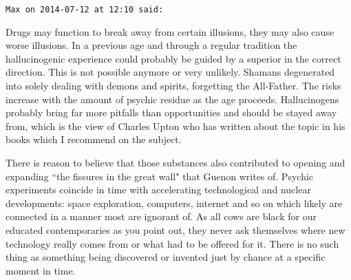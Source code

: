 \begin{footnotesize}
\begin{sffamily}
\hfill

\texttt{Max on 2014-07-12 at 12:10 said: }

Drugs may function to break away from certain illusions, they may also cause worse illusions. In a previous age and through a regular tradition the hallucinogenic experience could probably be guided by a superior in the correct direction. This is not possible anymore or very unlikely. Shamans degenerated into solely dealing with demons and spirits, forgetting the All-Father. The risks increase with the amount of psychic residue as the age proceeds. Hallucinogens probably bring far more pitfalls than opportunities and should be stayed away from, which is the view of Charles Upton who has written about the topic in his books which I recommend on the subject. 

There is reason to believe that those substances also contributed to opening and expanding ``the fissures in the great wall" that Guenon writes of. Psychic experiments coincide in time with accelerating technological and nuclear developments: space exploration, computers, internet and so on which likely are connected in a manner most are ignorant of. As all cows are black for our educated contemporaries as you point out, they never ask themselves where new technology really comes from or what had to be offered for it. There is no such thing as something being discovered or invented just by chance at a specific moment in time.


\end{sffamily}\end{footnotesize}
